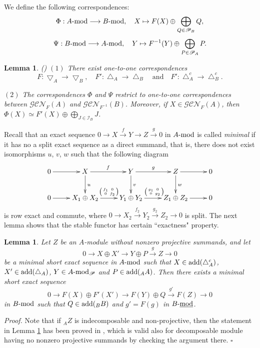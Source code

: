 \documentclass[12pt]{article}
\numberwithin{equation}{section}
\newtheorem{Lem}[Def]{Lemma}
\theoremstyle{definition}
\newcommand{\add}{{\rm add}}
\newcommand{\modcat}{\ensuremath{\mbox{{\rm -mod}}}}
\newcommand{\stmodcat}[1]{#1\mbox{{\rm -{\underline{mod}}}}}
\newcommand{\lra}{\longrightarrow}
\newcommand{\lraf}[1]{\stackrel{#1}{\lra}}
\newcommand{\ra}{\rightarrow}
\begin{document}
We define the following correspondences:
$$\Phi:A\modcat\lra B\modcat,\quad X\mapsto F(X)\oplus\bigoplus_{Q\in \mathscr{P}_B}Q,$$
$$\Psi:B\modcat\lra A\modcat,\quad Y\mapsto F^{-1}(Y)\oplus\bigoplus_{P\in \mathscr{P}_A}P.$$

\begin{Lem}\label{one-to-one}{\rm (\cite[Lemma 4.10]{c21})}
$(1)$ There exist one-to-one correspondences
$$F:\bigtriangledown_A\lra \bigtriangledown_B
,\quad
F':\bigtriangleup_A\lra \bigtriangleup_B
\quad\mbox{and}\quad
F':\bigtriangleup_A^c\lra \bigtriangleup_B^c.$$

$(2)$ The correspondences $\Phi$ and $\Psi$ restrict to one-to-one correspondences between $\mathcal{GCN}_{F}(A)$ and $\mathcal{GCN}_{F^{-1}}(B)$. Moreover, if $X\in \mathcal{GCN}_{F}(A)$, then $\Phi(X)\simeq F'(X)\oplus \bigoplus_{J\in\mathscr{I}_B}J$.
\end{Lem}

Recall that an exact sequence $0\ra X\lraf{f} Y\ra Z\lraf{g} 0$ in $A\modcat$ is called \emph{minimal} if it has no a split exact sequence as a direct summand, that is, there does not exist isomorphisms $u$, $v$, $w$ such that the following diagram
$$\xymatrix{
0\ar[r]
&X\ar[r]^{f}\ar[d]^{u}
&Y\ar[r]^g\ar[d]^{v}
&Z\ar[r]\ar[d]^{w}
&0\\
0\ar[r]&X_1\oplus
X_2\ar[r]^{\text{
$\left(
\begin{smallmatrix}
f_1&0\\
0&f_2
\end{smallmatrix}\right)
$}}
&Y_1\oplus Y_2\ar[r]^{\text{
$\left(
\begin{smallmatrix}
g_1&0\\
0&g_2
\end{smallmatrix}\right)
$}}&Z_1\oplus Z_2\ar[r]&0
}$$
is row exact and commute, where $0\ra X_2\lraf{f_2} Y_2\lraf{g_2}Z_2\ra 0$ is split. The next lemma shows that the stable functor has certain ``exactness" property.
\begin{Lem}\label{exact}
Let $Z$ be an $A$-module without nonzero projective summands, and let $$0\lra X\oplus X'\lra Y\oplus P\lraf{g}Z\lra 0$$ be a minimal short exact sequence in $A\modcat$ such that $X\in \add(\bigtriangleup_A^c)$, $X'\in \add(\bigtriangleup_A)$, $Y\in A\modcat_{\mathscr{P}}$ and $P\in\add(_AA)$.
Then there exists a minimal short exact sequence $$0\lra F(X)\oplus F'(X')\lra F(Y)\oplus Q\lraf{g'}F(Z)\lra 0$$ in $B\modcat$
such that $Q\in \add(_BB)$ and $g'=F(g)$ in $\stmodcat{B}$.
\end{Lem}
{\it Proof.} Note that if $_AZ$ is indecomposable and non-projective, then the statement in Lemma \ref{exact} has been proved in \cite[Lemma 4.13]{c21}, which is valid also for decomposable module having no nonzero projective summands by checking the argument there. $\square$
\end{document}
